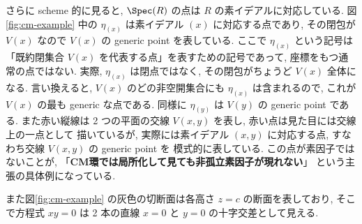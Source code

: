 \documentclass[article,paper=b5paper]{jlreq}
\begin{document}
さらに scheme 的に見ると, $\Spec(R)$ の点は $R$ の素イデアルに対応している.
図\ref{fig:cm-example} 中の $\eta_{(x)}$ は素イデアル $(x)$ に対応する点であり, その閉包が $V(x)$ なので
$V(x)$ の generic point を表している. ここで $\eta_{(x)}$ という記号は
「既約閉集合 $V(x)$ を代表する点」を表すための記号であって, 座標をもつ通常の点ではない.
実際, $\eta_{(x)}$ は閉点ではなく, その閉包がちょうど $V(x)$ 全体になる.
言い換えると, $V(x)$ のどの非空開集合にも $\eta_{(x)}$ は含まれるので, これが
$V(x)$ の最も generic な点である. 同様に $\eta_{(y)}$ は $V(y)$ の generic point である.
また赤い縦線は 2 つの平面の交線 $V(x,y)$ を表し, 赤い点は見た目には交線上の一点として
描いているが, 実際には素イデアル $(x,y)$ に対応する点, すなわち交線 $V(x,y)$ の generic point を
模式的に表している. この点が素因子ではないことが, 「\textbf{CM環では局所化して見ても非孤立素因子が現れない}」
という主張の具体例になっている.

また図\ref{fig:cm-example} の灰色の切断面は各高さ $z=c$ の断面を表しており, そこで方程式 $xy=0$ は
2 本の直線 $x=0$ と $y=0$ の十字交差として見える.
\end{document}

